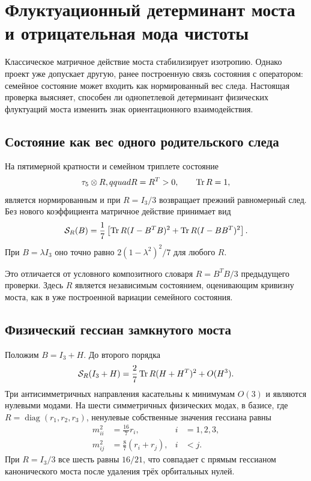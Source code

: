 \chapter{Флуктуационный детерминант моста и отрицательная мода чистоты}

Классическое матричное действие моста стабилизирует изотропию. Однако
проект уже допускает другую, ранее построенную связь состояния с
оператором: семейное состояние может входить как нормированный вес следа.
Настоящая проверка выясняет, способен ли однопетлевой детерминант физических
флуктуаций моста изменить знак ориентационного взаимодействия.

\section{Состояние как вес одного родительского следа}

На пятимерной кратности и семейном триплете состояние
\begin{equation}
 \tau_5\otimes R,qquad R=R^T>0,\qquad\operatorname{Tr} R=1,
 \label{eq:v6-state-weighted-bridge-trace}
\end{equation}
является нормированным и при $R=I_3/3$ возвращает прежний равномерный
след. Без нового коэффициента матричное действие принимает вид
\begin{equation}
 \mathcal S_R(B)=\frac17\left[
 \operatorname{Tr} R(I-B^TB)^2+\operatorname{Tr} R(I-BB^T)^2\right].
 \label{eq:v6-state-weighted-bridge-action}
\end{equation}
При $B=\lambda I_3$ оно точно равно
$2(1-\lambda^2)^2/7$ для любого $R$.

Это отличается от условного композитного словаря $R=B^TB/3$ предыдущего
проверки. Здесь $R$ является независимым состоянием, оценивающим кривизну
моста, как в уже построенной вариации семейного состояния.

\section{Физический гессиан замкнутого моста}

Положим $B=I_3+H$. До второго порядка
\begin{equation}
 \mathcal S_R(I_3+H)
 =\frac27\operatorname{Tr} R(H+H^T)^2+O(H^3).
\end{equation}
Три антисимметричных направления касательны к минимумам $O(3)$ и являются
нулевыми модами. На шести симметричных физических модах, в базисе, где
$R=\operatorname{diag}(r_1,r_2,r_3)$, ненулевые собственные значения
гессиана равны
\begin{align}
 m_{ii}^2&=\frac{16}{7}r_i,
 &i&=1,2,3,\label{eq:v6-bridge-diagonal-masses}\\
 m_{ij}^2&=\frac87(r_i+r_j),
 &i&<j.\label{eq:v6-bridge-offdiagonal-masses}
\end{align}
При $R=I_3/3$ все шесть равны $16/21$, что совпадает с прямым гессианом
канонического моста после удаления трёх орбитальных нулей.

